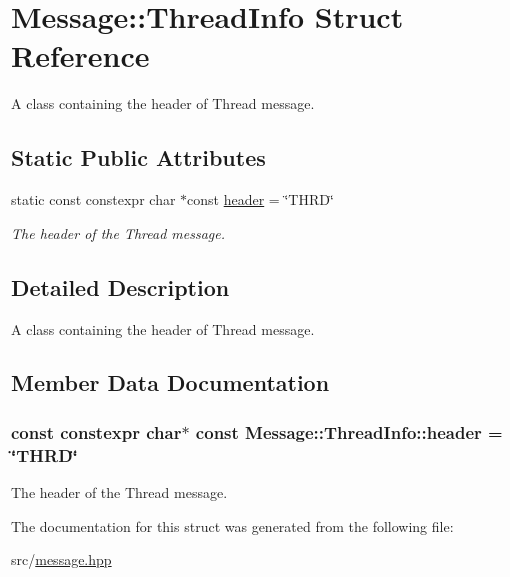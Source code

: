 \hypertarget{struct_message_1_1_thread_info}{\section{Message\-:\-:Thread\-Info Struct Reference}
\label{struct_message_1_1_thread_info}
}


A class containing the header of Thread message.  


\subsection*{Static Public Attributes}
\begin{DoxyCompactItemize}
\item 
static const constexpr char $\ast$const \hyperlink{struct_message_1_1_thread_info_a816274d8018a4ad34f796f2aaec27c65}{header} = \char`\"{}T\-H\-R\-D\char`\"{}
\begin{DoxyCompactList}\small\item\em The header of the Thread message. \end{DoxyCompactList}\end{DoxyCompactItemize}


\subsection{Detailed Description}
A class containing the header of Thread message. 

\subsection{Member Data Documentation}
\hypertarget{struct_message_1_1_thread_info_a816274d8018a4ad34f796f2aaec27c65}{
\subsubsection[{header}]{\setlength{\rightskip}{0pt plus 5cm}const constexpr char$\ast$ const Message\-::\-Thread\-Info\-::header = \char`\"{}T\-H\-R\-D\char`\"{}\hspace{0.3cm}{\ttfamily [static]}}}\label{struct_message_1_1_thread_info_a816274d8018a4ad34f796f2aaec27c65}


The header of the Thread message. 



The documentation for this struct was generated from the following file\-:\begin{DoxyCompactItemize}
\item 
src/\hyperlink{message_8hpp}{message.\-hpp}\end{DoxyCompactItemize}
